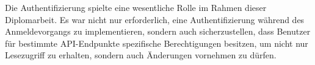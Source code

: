 Die Authentifizierung spielte eine wesentliche Rolle im Rahmen dieser Diplomarbeit. Es war nicht nur erforderlich, eine Authentifizierung während des Anmeldevorgangs zu implementieren, sondern auch sicherzustellen, dass Benutzer für bestimmte API-Endpunkte spezifische Berechtigungen besitzen, um nicht nur Lesezugriff zu erhalten, sondern auch Änderungen vornehmen zu dürfen.
